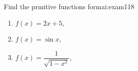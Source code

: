 \documentclass{scrbook}
\begin{document}
  \begin{mathexam}{Find the prmitive functions for}{mai:exam118}
    \begin{enumerate}
      \item \(f(x) = 2x+5\),
      \item \(f(x) = \sin x\),
      \item \(f(x) = \dfrac{1}{\sqrt{1-x^2}}\),
    \end{enumerate}
    \tcblower
    \blindmathtrue
    \blindmathpaper
  \end{mathexam}
\end{document}
